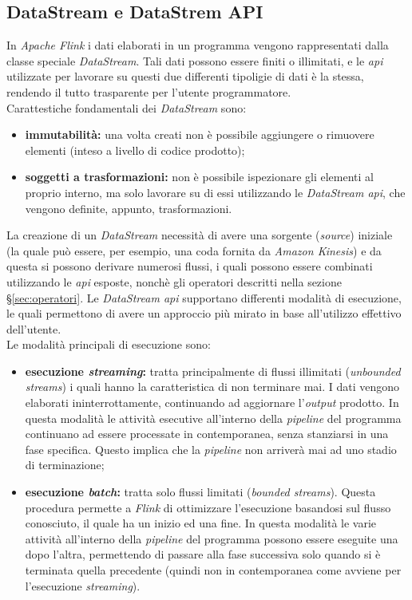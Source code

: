 \subsection{DataStream e DataStrem API}
In \textit{Apache Flink} i dati elaborati in un programma vengono rappresentati dalla classe speciale \textit{DataStream}.
Tali dati possono essere finiti o illimitati, e le \textit{\gls{api}} utilizzate per lavorare su questi due differenti tipoligie di dati è la stessa, rendendo il tutto trasparente per l'utente programmatore.\\
Carattestiche fondamentali dei \textit{DataStream} sono:
\begin{itemize}
	\item{\textbf{immutabilità:} una volta creati non è possibile aggiungere o rimuovere elementi (inteso a livello di codice prodotto);}
	\item{\textbf{soggetti a trasformazioni:} non è possibile ispezionare gli elementi al proprio interno, ma solo lavorare su di essi utilizzando le \textit{DataStream \textit{\gls{api}}}, che vengono definite, appunto, trasformazioni.}
\end{itemize}
La creazione di un \textit{DataStream} necessità di avere una sorgente (\textit{source}) iniziale (la quale può essere, per esempio, una coda fornita da \textit{\gls{Amazon Kinesis}}) e da questa si possono derivare numerosi flussi, i quali possono essere combinati utilizzando le \textit{\gls{api}} esposte, nonchè gli operatori descritti nella sezione \S\ref{sec:operatori}.
Le \textit{DataStream \textit{\gls{api}}} supportano differenti modalità di esecuzione, le quali permettono di avere un approccio più mirato in base all'utilizzo effettivo dell'utente.\\
Le modalità principali di esecuzione sono:
\begin{itemize}
	\item{\textbf{esecuzione \textit{streaming}:} tratta principalmente di flussi illimitati (\textit{\gls{unbounded streams}}) i quali hanno la caratteristica di non terminare mai. I dati vengono elaborati ininterrottamente, continuando ad aggiornare l'\textit{output} prodotto. In questa modalità le attività esecutive all'interno della \textit{\gls{pipeline}} del programma continuano ad essere processate in contemporanea, senza stanziarsi in una fase specifica. Questo implica che la \textit{\gls{pipeline}} non arriverà mai ad uno stadio di terminazione;}
	\item{\textbf{esecuzione \textit{batch}:} tratta solo flussi limitati (\textit{\gls{bounded streams}}). Questa procedura permette a \textit{Flink} di ottimizzare l'esecuzione basandosi sul flusso conosciuto, il quale ha un inizio ed una fine. In questa modalità le varie attività all'interno della \textit{\gls{pipeline}} del programma possono essere eseguite una dopo l'altra, permettendo di passare alla fase successiva solo quando si è terminata quella precedente (quindi non in contemporanea come avviene per l'esecuzione \textit{streaming})}.
\end{itemize}

